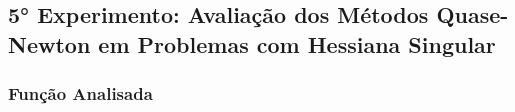 \subsection{5° Experimento: Avaliação dos Métodos Quase-Newton em Problemas com Hessiana Singular}
    \subsubsection{Função Analisada}

\newpage